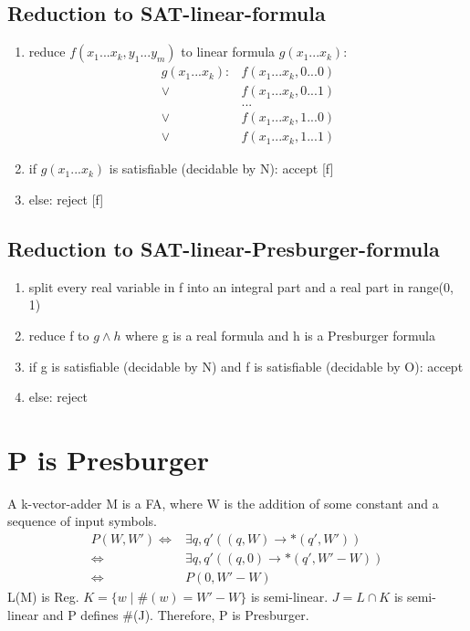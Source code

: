 \documentclass{article}
\begin{document}
\subsection{Reduction to SAT-linear-formula}
\begin{enumerate}
	\item reduce $ f(x_1 ... x_k, y_1 ... y_m) $ to linear formula $ g(x_1 ... 
	x_k) $:
	\begin{align*}
		g(x_1 ... x_k):& f(x_1 ... x_k, 0 ... 0) \\
		 \lor& f(x_1 ... x_k, 0 ... 1) \\
		& ... \\
		\lor& f(x_1 ... x_k, 1 ... 0) \\
		\lor& f(x_1 ... x_k, 1 ... 1)
	\end{align*}
	\item if $ g(x_1 ... x_k) $ is satisfiable (decidable by N): accept [f]
	\item else: reject [f]
\end{enumerate}

\subsection{Reduction to SAT-linear-Presburger-formula}
\begin{enumerate}
	\item split every real variable in f into an integral part and a real 
	part in range(0, 1)
	\item reduce f to $ g \land h $ where g is a real formula and h is a 
	Presburger formula
	\item if g is satisfiable (decidable by N) and f is satisfiable (decidable 
	by O): accept
	\item else: reject
\end{enumerate}

\section{P is Presburger}
A k-vector-adder M is a FA, where W is the addition of some constant and a 
sequence of input symbols.
\begin{align*}
	P(W, W')
	\iff& \exists q, q' ((q, W) \rightarrow* (q', W'))\\
	\iff& \exists q, q' ((q, 0) \rightarrow* (q', W'-W))\\
	\iff& P(0, W' - W)
\end{align*}
L(M) is Reg. $ K = \{w \mid \#(w) = W'-W\} $ is semi-linear. $ J = L \cap K $ 
is semi-linear and P defines \#(J). 
Therefore, P is Presburger.
\end{document}
